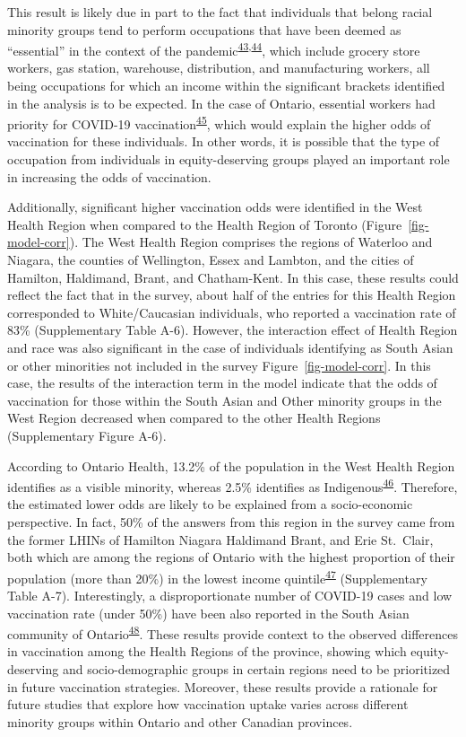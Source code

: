 \documentclass[
  letterpaper,
  DIV=11,
  numbers=noendperiod]{scrartcl}
\begin{document}
This result is likely due in part to the fact that individuals that
belong racial minority groups tend to perform occupations that have been
deemed as ``essential'' in the context of the
pandemic\textsuperscript{\protect\hyperlink{ref-hawkins2020}{43},\protect\hyperlink{ref-ct2021}{44}},
which include grocery store workers, gas station, warehouse,
distribution, and manufacturing workers, all being occupations for which
an income within the significant brackets identified in the analysis is
to be expected. In the case of Ontario, essential workers had priority
for COVID-19
vaccination\textsuperscript{\protect\hyperlink{ref-mishra2021}{45}},
which would explain the higher odds of vaccination for these
individuals. In other words, it is possible that the type of occupation
from individuals in equity-deserving groups played an important role in
increasing the odds of vaccination.

Additionally, significant higher vaccination odds were identified in the
West Health Region when compared to the Health Region of Toronto
(Figure~\ref{fig-model-corr}). The West Health Region comprises the
regions of Waterloo and Niagara, the counties of Wellington, Essex and
Lambton, and the cities of Hamilton, Haldimand, Brant, and Chatham-Kent.
In this case, these results could reflect the fact that in the survey,
about half of the entries for this Health Region corresponded to
White/Caucasian individuals, who reported a vaccination rate of 83\%
(Supplementary Table A-6). However, the interaction effect of Health
Region and race was also significant in the case of individuals
identifying as South Asian or other minorities not included in the
survey Figure~\ref{fig-model-corr}. In this case, the results of the
interaction term in the model indicate that the odds of vaccination for
those within the South Asian and Other minority groups in the West
Region decreased when compared to the other Health Regions
(Supplementary Figure A-6).

According to Ontario Health, 13.2\% of the population in the West Health
Region identifies as a visible minority, whereas 2.5\% identifies as
Indigenous\textsuperscript{\protect\hyperlink{ref-ontariohealth}{46}}.
Therefore, the estimated lower odds are likely to be explained from a
socio-economic perspective. In fact, 50\% of the answers from this
region in the survey came from the former LHINs of Hamilton Niagara
Haldimand Brant, and Erie St.~Clair, both which are among the regions of
Ontario with the highest proportion of their population (more than 20\%)
in the lowest income
quintile\textsuperscript{\protect\hyperlink{ref-buajitti2018}{47}}
(Supplementary Table A-7). Interestingly, a disproportionate number of
COVID-19 cases and low vaccination rate (under 50\%) have been also
reported in the South Asian community of
Ontario\textsuperscript{\protect\hyperlink{ref-anand2022}{48}}. These
results provide context to the observed differences in vaccination among
the Health Regions of the province, showing which equity-deserving and
socio-demographic groups in certain regions need to be prioritized in
future vaccination strategies. Moreover, these results provide a
rationale for future studies that explore how vaccination uptake varies
across different minority groups within Ontario and other Canadian
provinces.
\end{document}
